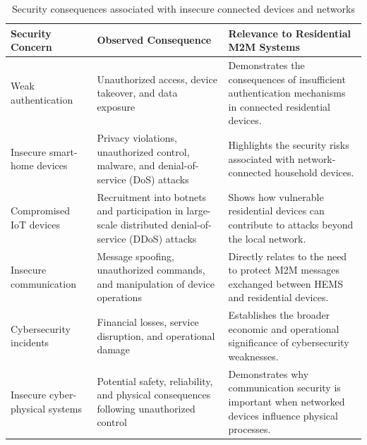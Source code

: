 \begin{table}[htbp]
  \centering
  \caption{Security consequences associated with insecure connected devices and networks}
  \label{tab:security_consequences_intro}
  \renewcommand{\arraystretch}{1.2}
  \begin{tabular}{p{3.2cm} p{5.2cm} p{5.2cm}}
    \hline
    \textbf{Security Concern}
     & \textbf{Observed Consequence}
     & \textbf{Relevance to Residential M2M Systems}                                                             \\
    \hline
    Weak authentication
     & Unauthorized access, device takeover, and data exposure
     & Demonstrates the consequences of insufficient authentication mechanisms in connected residential devices. \\

    Insecure smart-home devices
     & Privacy violations, unauthorized control, malware, and denial-of-service (DoS) attacks
     & Highlights the security risks associated with network-connected household devices.                        \\

    Compromised IoT devices
     & Recruitment into botnets and participation in large-scale distributed denial-of-service (DDoS) attacks
     & Shows how vulnerable residential devices can contribute to attacks beyond the local network.              \\

    Insecure communication
     & Message spoofing, unauthorized commands, and manipulation of device operations
     & Directly relates to the need to protect M2M messages exchanged between HEMS and residential devices.      \\

    Cybersecurity incidents
     & Financial losses, service disruption, and operational damage
     & Establishes the broader economic and operational significance of cybersecurity weaknesses.                \\

    Insecure cyber-physical systems
     & Potential safety, reliability, and physical consequences following unauthorized control
     & Demonstrates why communication security is important when networked devices influence physical processes. \\
    \hline
  \end{tabular}
\end{table}

